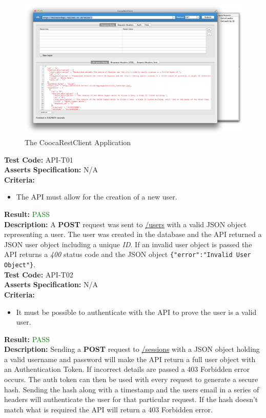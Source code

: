 \documentclass[11pt,a4paper]{report}
\begin{document}
\begin{figure}[H]
   \centering
   \includegraphics{CoocaRestClient} %
   \caption{The CoocaRestClient Application}
   \label{fig:coocaRest}
\end{figure}

\label{test:API-T01}
\noindent\textbf{Test Code:} API-T01\\
\textbf{Asserts Specification:} N/A \\ 
\textbf{Criteria:} \begin{itemize}
                     \item The API must allow for the creation of a new user.
                   \end{itemize}  
\textbf{Result:} \textcolor{green}{PASS}\\ 
\textbf{Description:} A \textbf{POST} request was sent to \url{/users} with a valid JSON object representing a user. The user was created in the database and the API returned a JSON user object including a unique \textit{ID}. If an invalid user object is passed the API returns a \textit{400} status code and the JSON object \lstinline${"error":"Invalid User Object"}$.\\ 

\label{test:API-T02}
\noindent\textbf{Test Code:} API-T02\\
\textbf{Asserts Specification:} N/A \\ 
\textbf{Criteria:} \begin{itemize}
                     \item It must be possible to authenticate with the API to prove the user is a valid user. 
                   \end{itemize}  
\textbf{Result:} \textcolor{green}{PASS}\\ 
\textbf{Description:} Sending a \textbf{POST} request to \url{/sessions} with a JSON object holding a valid username and password will make the API return a full user object with an Authentication Token. If incorrect details are passed a 403 Forbidden error occurs. The auth token can then be used with every request to generate a secure hash. Sending the hash along with a timestamp and the users email in a series of headers will authenticate the user for that particular request. If the hash doesn't match what is required the API will return a 403 Forbidden error. \\ 
\end{document}
